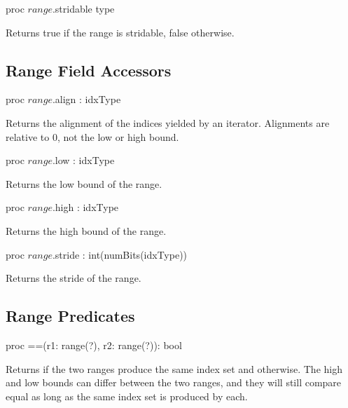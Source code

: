 \begin{protohead}
proc $range$.stridable type
\end{protohead}
\begin{protobody}
Returns true if the range is stridable, false otherwise.
\end{protobody}

\subsection{Range Field Accessors}

\begin{protohead}
proc $range$.align : idxType
\end{protohead}
\begin{protobody}
Returns the alignment of the indices yielded by an iterator.  Alignments are
relative to 0, not the low or high bound.
\end{protobody}

\begin{protohead}
proc $range$.low : idxType
\end{protohead}
\begin{protobody}
Returns the low bound of the range.
\end{protobody}

\begin{protohead}
proc $range$.high : idxType
\end{protohead}
\begin{protobody}
Returns the high bound of the range.
\end{protobody}

\begin{protohead}
proc $range$.stride : int(numBits(idxType))
\end{protohead}
\begin{protobody}
Returns the stride of the range.
\end{protobody}

\subsection{Range Predicates}

\begin{protohead}
proc ==(r1: range(?), r2: range(?)): bool
\end{protohead}
\begin{protobody}
Returns  if the two ranges produce the same index set
and  otherwise.  The high and low bounds can differ between the two
ranges, and they will still compare equal as long as the same index set is
produced by each.
\end{protobody}

